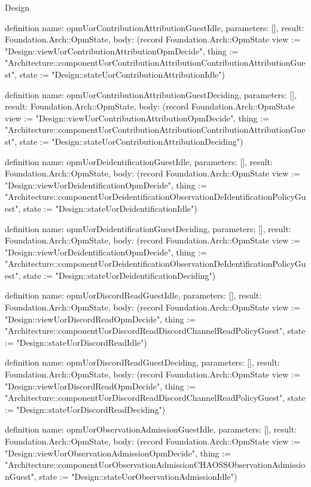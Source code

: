 \begin{lexlean}{Design}
\begin{semanticmodule}
definition{
  name: opmUorContributionAttributionGuestIdle,
  parameters: [],
  result: Foundation.Arch::OpmState,
  body: (record Foundation.Arch::OpmState {view := "Design::viewUorContributionAttributionOpmDecide", thing := "Architecture::componentUorContributionAttributionContributionAttributionGuest", state := "Design::stateUorContributionAttributionIdle"})
}

definition{
  name: opmUorContributionAttributionGuestDeciding,
  parameters: [],
  result: Foundation.Arch::OpmState,
  body: (record Foundation.Arch::OpmState {view := "Design::viewUorContributionAttributionOpmDecide", thing := "Architecture::componentUorContributionAttributionContributionAttributionGuest", state := "Design::stateUorContributionAttributionDeciding"})
}

definition{
  name: opmUorDeidentificationGuestIdle,
  parameters: [],
  result: Foundation.Arch::OpmState,
  body: (record Foundation.Arch::OpmState {view := "Design::viewUorDeidentificationOpmDecide", thing := "Architecture::componentUorDeidentificationObservationDeIdentificationPolicyGuest", state := "Design::stateUorDeidentificationIdle"})
}

definition{
  name: opmUorDeidentificationGuestDeciding,
  parameters: [],
  result: Foundation.Arch::OpmState,
  body: (record Foundation.Arch::OpmState {view := "Design::viewUorDeidentificationOpmDecide", thing := "Architecture::componentUorDeidentificationObservationDeIdentificationPolicyGuest", state := "Design::stateUorDeidentificationDeciding"})
}

definition{
  name: opmUorDiscordReadGuestIdle,
  parameters: [],
  result: Foundation.Arch::OpmState,
  body: (record Foundation.Arch::OpmState {view := "Design::viewUorDiscordReadOpmDecide", thing := "Architecture::componentUorDiscordReadDiscordChannelReadPolicyGuest", state := "Design::stateUorDiscordReadIdle"})
}

definition{
  name: opmUorDiscordReadGuestDeciding,
  parameters: [],
  result: Foundation.Arch::OpmState,
  body: (record Foundation.Arch::OpmState {view := "Design::viewUorDiscordReadOpmDecide", thing := "Architecture::componentUorDiscordReadDiscordChannelReadPolicyGuest", state := "Design::stateUorDiscordReadDeciding"})
}

definition{
  name: opmUorObservationAdmissionGuestIdle,
  parameters: [],
  result: Foundation.Arch::OpmState,
  body: (record Foundation.Arch::OpmState {view := "Design::viewUorObservationAdmissionOpmDecide", thing := "Architecture::componentUorObservationAdmissionCHAOSSObservationAdmissionGuest", state := "Design::stateUorObservationAdmissionIdle"})
}


\end{semanticmodule}
\end{lexlean}
